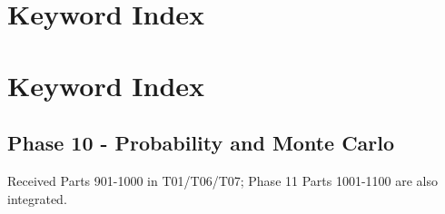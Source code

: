 \hypertarget{appendix-a6d556a4ef50}{}
\section*{Keyword Index}
\section{Keyword Index}\label{appendix-a6d556a4ef50-keyword-index}

\subsection{Phase 10 - Probability and Monte Carlo}\label{appendix-a6d556a4ef50-phase-10---probability-and-monte-carlo}

Received Parts 901-1000 in T01/T06/T07; Phase 11 Parts 1001-1100 are also integrated.

